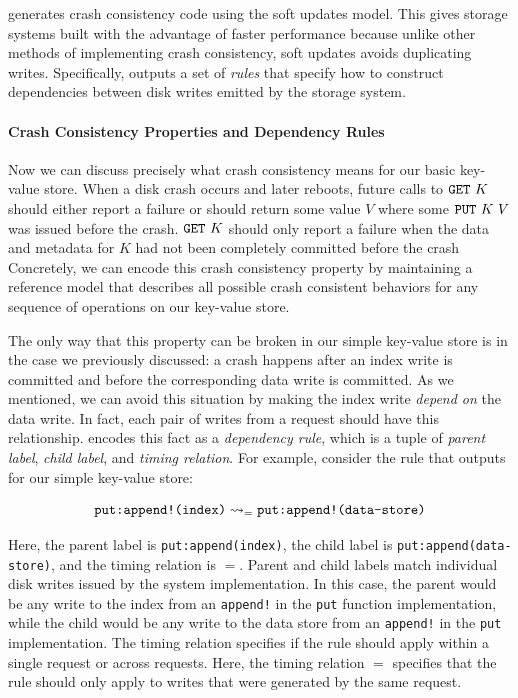 \depsynth generates crash consistency code using the soft updates model.
This gives storage systems built with \depsynth the advantage of faster performance because unlike
other methods of implementing crash consistency, soft updates avoids duplicating writes.
Specifically, \depsynth outputs a set of \textit{rules} that specify how to construct dependencies
between disk writes emitted by the storage system.

\paragraph{Crash Consistency Properties and Dependency Rules}
Now we can discuss precisely what crash consistency means for our basic key-value store. When a disk
crash occurs and later reboots, future calls to $\get\ K$ should either report a failure or should
return some value $V$ where some $\putreq\ K\ V$ was issued before the crash. $\get\ K$ should only
report a failure when the data and metadata for $K$ had not been completely committed before the crash
Concretely, we can encode this crash consistency property by maintaining a reference model that
describes all possible crash consistent behaviors for any sequence of operations on our key-value store.


The only way that this property can be broken in our simple key-value store is in the case we previously
discussed: a crash happens after an index write is committed and before the corresponding data write is committed.
As we mentioned, we can avoid this situation by making the index write \textit{depend on} the data write.
In fact, each pair of writes from a \putreq request should have this relationship. \depsynth encodes this fact
as a \textit{dependency rule}, which is a tuple of \textit{parent label}, \textit{child label},
and \textit{timing relation}.
For example, consider the rule that \depsynth outputs for our simple key-value store:

$$ \deprule{\texttt{put:append!(index)}}{\texttt{put:append!(data-store)}}{=}$$

Here, the parent label is \texttt{put:append(index)}, the child label is \texttt{put:append(data-store)},
and the timing relation is $=$. Parent and child labels match individual disk writes issued by the
system implementation. In this case, the parent would be any write to the index from an \texttt{append!} in the
\texttt{put} function implementation, while the child would be any write to the data store from an \texttt{append!}
in the \texttt{put} implementation. The timing relation specifies if the rule should apply within a single request
or across requests. Here, the timing relation $=$ specifies that the rule should only apply to writes that were
generated by the same \putreq request.

